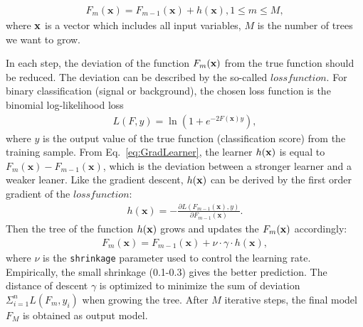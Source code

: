 \begin{equation} \label{eq:GradLearner}
  \begin{aligned}
	F_{m}(\mathbf{x}) = F_{m-1}(\mathbf{x}) + h(\mathbf{x}), 1 \leq m \leq M ,
  \end{aligned}
\end{equation}
where $\bf{x}$ is a vector which includes all input variables, $M$ is the number of trees we want to grow.


In each step, the deviation of the function $F_{m}(\bf{x})$ from the true function should be reduced.
The deviation can be described by the so-called $loss function$.
For binary classification (signal or background), the chosen loss function is the binomial log-likelihood loss
\begin{equation} \label{eq:binaryLF}
  \begin{aligned}
	L(F,y) =  \ln (1+e^{-2F(\mathbf{x})y}) ,
  \end{aligned}
\end{equation}
where $y$ is the output value of the true function (classification score) from the training sample.
From Eq.~\ref{eq:GradLearner}, the learner $h(\bf{x})$ is equal to $F_{m}(\mathbf{x}) - F_{m-1}(\mathbf{x})$, which is the deviation between a stronger learner and a weaker leaner.
Like the gradient descent, $h(\bf{x})$ can be derived by the first order gradient of the $loss function$:
\begin{equation} \label{eq:GradApproach}
  \begin{aligned}
	h(\mathbf{x}) = - \frac{\partial L(F_{m-1}(\mathbf{x}),y)}{\partial F_{m-1}(\mathbf{x})} .
  \end{aligned}
\end{equation}
Then the tree of the function $h(\bf{x})$ grows and updates the $F_{m}(\bf{x})$ accordingly:
\begin{equation} \label{eq:shrinkage}
  \begin{aligned}
	F_{m}(\mathbf{x}) = F_{m-1}(\mathbf{x}) + \nu\cdot\gamma\cdot h(\mathbf{x}) ,
  \end{aligned}
\end{equation}
where $\nu$ is the \verb|shrinkage| parameter used to control the learning rate. Empirically, the small shrinkage (0.1-0.3) gives the better prediction.
The distance of descent $\gamma$ is optimized to minimize the sum of deviation $\Sigma^{n}_{i=1}L(F_{m},y_{i})$ when growing the tree.
After $M$ iterative steps, the final model $F_{M}$ is obtained as output model.

